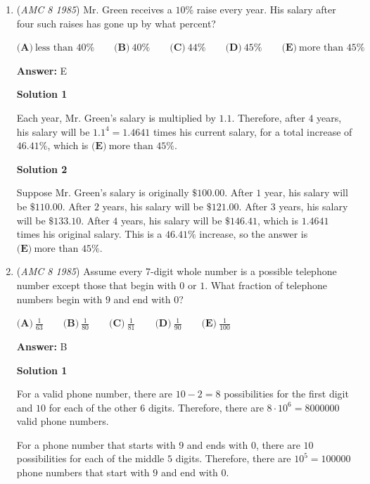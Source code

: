 \begin{enumerate}
 


	\item (\textit{AMC 8 1985}) Mr. Green receives a $10\%$ raise every year.  His salary after four such raises has gone up by what percent?


 $\textbf{(A)}\ \text{less than }40\% \qquad \textbf{(B)}\ 40\% \qquad \textbf{(C)}\ 44\% \qquad \textbf{(D)}\ 45\% \qquad \textbf{(E)}\ \text{more than }45\%$

 \textbf{Answer: }E



\textbf{Solution 1}

Each year, Mr. Green's salary is multiplied by $1.1$.  Therefore, after $4$ years, his salary will be $1.1^4 = 1.4641$ times his current salary, for a total increase of $46.41\%$, which is $\boxed{\textbf{(E)}\ \text{more than }45\% }$.

 



\textbf{Solution 2}

Suppose Mr. Green's salary is originally $\$100.00$. After $1$ year, his salary will be $\$110.00$. After $2$ years, his salary will be $\$121.00$.  After $3$ years, his salary will be $\$133.10$.  After $4$ years, his salary will be $\$146.41$, which is $1.4641$ times his original salary.  This is a $46.41\%$ increase, so the answer is $\boxed{\textbf{(E)}\ \text{more than 45\%}}$. 

 


	\item (\textit{AMC 8 1985}) Assume every 7-digit whole number is a possible telephone number except those that begin with $0$ or $1$.  What fraction of telephone numbers begin with $9$ and end with $0$?


 $\textbf{(A)}\ \frac{1}{63} \qquad \textbf{(B)}\ \frac{1}{80} \qquad \textbf{(C)}\ \frac{1}{81} \qquad \textbf{(D)}\ \frac{1}{90} \qquad \textbf{(E)}\ \frac{1}{100}$

 \textbf{Answer: }B



\textbf{Solution 1}

For a valid phone number, there are $10-2=8$ possibilities for the first digit and $10$ for each of the other $6$ digits.  Therefore, there are $8 \cdot 10^6 = 8000000$ valid phone numbers.

 For a phone number that starts with $9$ and ends with $0$, there are $10$ possibilities for each of the middle $5$ digits.  Therefore, there are $10^5 = 100000$ phone numbers that start with $9$ and end with $0$.


\end{enumerate}
